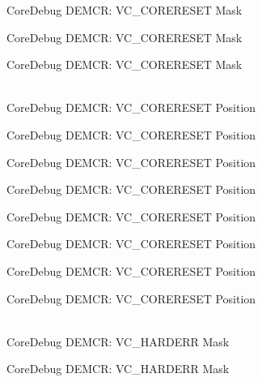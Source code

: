 \begin{DoxyRefList}
\label{deprecated__deprecated000432}%
%
Core\+Debug DEMCR:\+ VC\+\_\+\+CORERESET Mask 

\label{deprecated__deprecated000521}%
%
Core\+Debug DEMCR:\+ VC\+\_\+\+CORERESET Mask 

\label{deprecated__deprecated000623}%
%
Core\+Debug DEMCR:\+ VC\+\_\+\+CORERESET Mask  
\item[{\parbox[t]{\linewidth}{Global \doxylink{group__CMSIS__CoreDebug_ga9fcf09666f7063a7303117aa32a85d5a}{Core\+Debug\+\_\+\+DEMCR\+\_\+\+VC\+\_\+\+CORERESET\+\_\+\+Pos} }}]\hfill \\
\label{deprecated__deprecated000069}%
%
Core\+Debug DEMCR:\+ VC\+\_\+\+CORERESET Position 

\label{deprecated__deprecated000137}%
%
Core\+Debug DEMCR:\+ VC\+\_\+\+CORERESET Position 

\label{deprecated__deprecated000213}%
%
Core\+Debug DEMCR:\+ VC\+\_\+\+CORERESET Position 

\label{deprecated__deprecated000276}%
%
Core\+Debug DEMCR:\+ VC\+\_\+\+CORERESET Position 

\label{deprecated__deprecated000355}%
%
Core\+Debug DEMCR:\+ VC\+\_\+\+CORERESET Position 

\label{deprecated__deprecated000431}%
%
Core\+Debug DEMCR:\+ VC\+\_\+\+CORERESET Position 

\label{deprecated__deprecated000520}%
%
Core\+Debug DEMCR:\+ VC\+\_\+\+CORERESET Position 

\label{deprecated__deprecated000622}%
%
Core\+Debug DEMCR:\+ VC\+\_\+\+CORERESET Position  
\item[{\parbox[t]{\linewidth}{Global \doxylink{group__CMSIS__CoreDebug_ga803fc98c5bb85f10f0347b23794847d1}{Core\+Debug\+\_\+\+DEMCR\+\_\+\+VC\+\_\+\+HARDERR\+\_\+\+Msk} }}]\hfill \\
\label{deprecated__deprecated000056}%
%
Core\+Debug DEMCR:\+ VC\+\_\+\+HARDERR Mask 

\label{deprecated__deprecated000136}%
%
Core\+Debug DEMCR:\+ VC\+\_\+\+HARDERR Mask 


\end{DoxyRefList}
